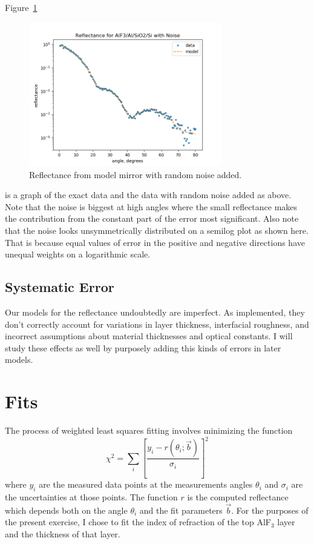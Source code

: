 \documentclass[english]{scrartcl}
\begin{document}
Figure~\ref{fig:noise}
\begin{figure}[htb]
  \begin{center}
    \includegraphics[width=0.75\textwidth]{images/noise}
  \end{center}
  \caption{\label{fig:noise}Reflectance from model mirror with random
  noise added.}
\end{figure}
is a graph of the exact data and the data with
random noise added as above. Note that the noise is biggest at high
angles where the small reflectance makes the contribution from the
constant part of the error most significant. Also note that the noise
looks unsymmetrically distributed on a semilog plot as shown here.
That is because equal values of error in the positive and negative
directions have unequal weights on a logarithmic scale.

\subsection{Systematic Error}
Our models for the reflectance undoubtedly are imperfect. As implemented,
they don't correctly account for variations in layer thickness, interfacial
roughness, and incorrect assumptions about material thicknesses and
optical constants. I will study these effects as well by purposely adding
this kinds of errors in later models.

\section{Fits}
The process of weighted least squares fitting involves minimizing
the function
\begin{equation}
\chi^2 = \sum_i\left[\frac{y_i - r(\theta_i;
	\vec{b})}{\sigma_i}\right]^2\label{eq:chisq}
\end{equation}
where $y_i$ are the measured data points at the measurements angles
$\theta_i$ and $\sigma_i$ are the uncertainties at those points. The
function $r$ is the computed reflectance which depends both on the angle
$\theta_i$ and the fit parameters $\vec{b}$. For the purposes of
the present exercise, I chose to fit the index of refraction of
the top AlF$_3$ layer and the thickness of that layer.
\end{document}
